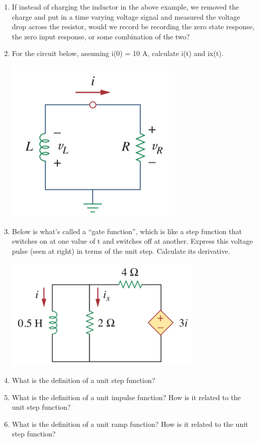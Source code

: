 \documentclass[11pt]{book}
\begin{document}
\begin{enumerate}
	\item If instead of charging the inductor in the above example, we removed the charge and put in a time varying voltage signal and measured the voltage drop across the resistor, would we record be recording the zero state response, the zero input response, or some combination of the two?
	\item For the circuit below, assuming i(0) = 10 A, calculate i(t) and ix(t).
	\begin{center}\includegraphics{figures/q2.02.png}\end{center}
	\item Below is what’s called a “gate function”, which is like a step function that switches on at one value of t and switches off at another. Express this voltage pulse (seen at right) in terms of the unit step. Calculate its derivative.
	\begin{center}\includegraphics{figures/q2.03.png}\end{center}
	\item What is the definition of a unit step function?
	\item What is the definition of a unit impulse function? How is it related to the unit step function?
	\item What is the definition of a unit ramp function? How is it related to the unit step function?

\end{enumerate}
\end{document}
